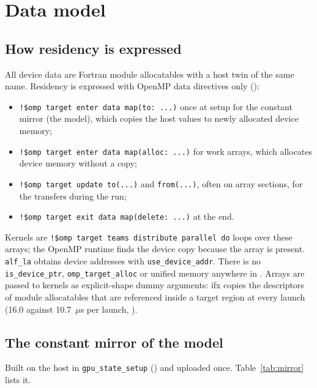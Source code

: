 \section{Data model}
\label{sec:data}


\subsection{How residency is expressed}

All device data are Fortran module allocatables with a host twin of the same name. Residency is expressed with OpenMP data directives only ():
\begin{itemize}
\item \texttt{!\$omp target enter data map(to: ...)} once at setup for the constant mirror (the model), which copies the host values to newly allocated device memory;
\item \texttt{!\$omp target enter data map(alloc: ...)} for work arrays, which allocates device memory without a copy;
\item \texttt{!\$omp target update to(...)} and \texttt{from(...)}, often on array sections, for the transfers during the run;
\item \texttt{!\$omp target exit data map(delete: ...)} at the end.
\end{itemize}
Kernels are \texttt{!\$omp target teams distribute parallel do} loops over these arrays; the OpenMP runtime finds the device copy because the array is present. \texttt{alf\_la} obtains device addresses with \texttt{use\_device\_addr}. There is no \texttt{is\_device\_ptr}, \texttt{omp\_target\_alloc} or unified memory anywhere in . Arrays are passed to kernels as explicit-shape dummy arguments: ifx copies the descriptors of module allocatables that are referenced inside a target region at every launch (16.0 against 10.7~$\mu$s per launch, ). %

\subsection{The constant mirror of the model}

Built on the host in \texttt{gpu\_state\_setup} () and uploaded once. Table~\ref{tab:mirror} lists it.


